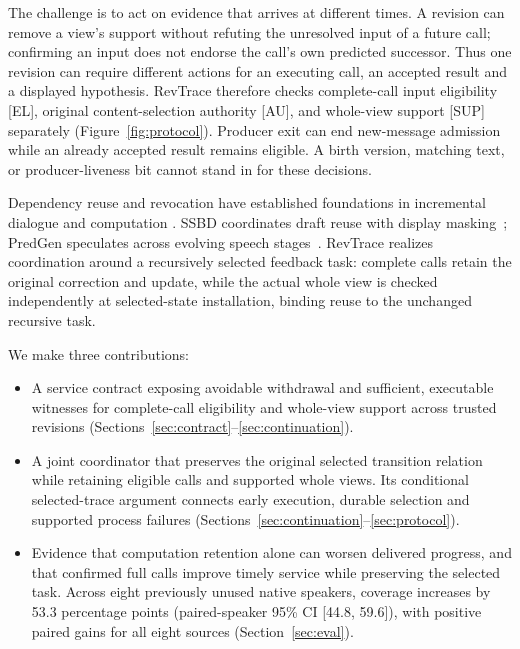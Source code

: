 The challenge is to act on evidence that arrives at different times.
A revision can remove a view's support without refuting the unresolved
input of a future call; confirming an input does not endorse the call's
own predicted successor. Thus one revision can require different actions
for an executing call, an accepted result and a displayed hypothesis.
RevTrace therefore checks complete-call input eligibility [EL], original
content-selection authority [AU], and whole-view support [SUP] separately
(Figure~\ref{fig:protocol}). Producer exit can end new-message admission
while an already accepted result remains eligible. A birth version,
matching text, or producer-liveness bit cannot stand in for these decisions.

Dependency reuse and revocation have established foundations in
incremental dialogue and computation
\cite{schlangen2011incremental,hammer2014adapton,hammer2015names}.
SSBD coordinates draft reuse with display masking~\cite{zeng2026ssbd};
PredGen speculates across evolving speech stages~\cite{li2025predgen}.
RevTrace realizes coordination around a recursively selected feedback
task: complete calls retain the original correction and update, while
the actual whole view is checked independently at selected-state
installation, binding reuse to the unchanged recursive task.

We make three contributions:
\begin{itemize}
\item A service contract exposing avoidable withdrawal and sufficient,
  executable witnesses for complete-call eligibility and whole-view
  support across trusted revisions
  (Sections~\ref{sec:contract}--\ref{sec:continuation}).
\item A joint coordinator that preserves the original selected transition
  relation while retaining eligible calls and supported whole views.
  Its conditional selected-trace argument connects early execution,
  durable selection and supported process failures
  (Sections~\ref{sec:continuation}--\ref{sec:protocol}).
\item Evidence that computation retention alone can worsen delivered
  progress, and that confirmed full calls improve timely service while
  preserving the selected task. Across eight previously unused native
  speakers, coverage increases by 53.3 percentage points
  (paired-speaker 95\% CI [44.8, 59.6]), with positive paired gains for all
  eight sources (Section~\ref{sec:eval}).
\end{itemize}

